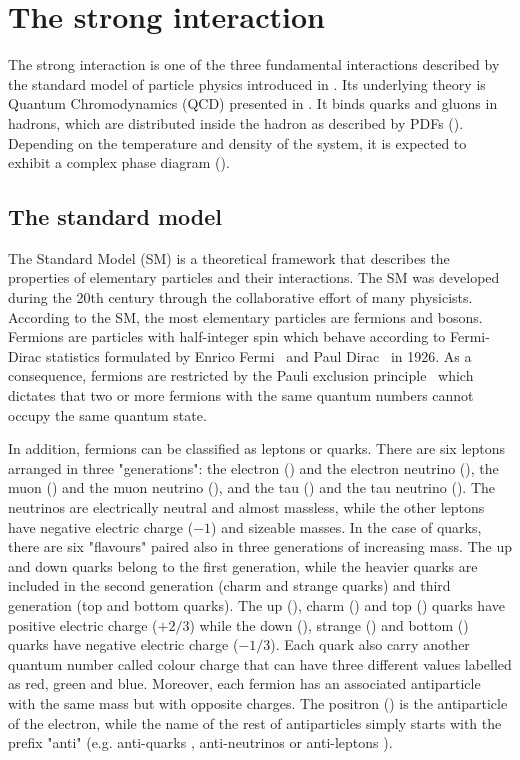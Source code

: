 \section{The strong interaction}\label{sec:Physics_SI}

The strong interaction is one of the three fundamental interactions described by the standard model of particle physics introduced in . Its underlying theory is Quantum Chromodynamics (QCD) presented in . It binds quarks and gluons in hadrons, which are distributed inside the hadron as described by PDFs (). Depending on the temperature and density of the system, it is expected to exhibit a complex phase diagram ().


\subsection{The standard model}\label{sec:Physics_SI_SM}

The Standard Model (SM) is a theoretical framework that describes the properties of elementary particles and their interactions. The SM was developed during the 20th century through the collaborative effort of many physicists. According to the SM, the most elementary particles are fermions and bosons. Fermions are particles with half-integer spin which behave according to Fermi-Dirac statistics formulated by Enrico Fermi~\cite{FermiDiracStatistics_1} and Paul Dirac~\cite{FermiDiracStatistics_2} in 1926. As a consequence, fermions are restricted by the Pauli exclusion principle~\cite{PauliExclusion} which dictates that two or more fermions with the same quantum numbers cannot occupy the same quantum state.

In addition, fermions can be classified as leptons or quarks. There are six leptons arranged in three "generations": the electron (\PGem) and the electron neutrino (\PGnGe), the muon (\PGmm) and the muon neutrino (\PGnGm), and the tau (\PGtm) and the tau neutrino (\PGnGt). The neutrinos are electrically neutral and almost massless, while the other leptons have negative electric charge ($-1$) and sizeable masses. In the case of quarks, there are six "flavours" paired also in three generations of increasing mass. The up and down quarks belong to the first generation, while the heavier quarks are included in the second generation (charm and strange quarks) and third generation (top and bottom quarks). The up (\cPqu), charm (\cPqc) and top (\cPqt) quarks have positive electric charge ($+2/3$) while the down (\cPqd), strange (\cPqs) and bottom (\cPqb) quarks have negative electric charge ($-1/3$). Each quark also carry another quantum number called colour charge that can have three different values labelled as red, green and blue. Moreover, each fermion has an associated antiparticle with the same mass but with opposite charges. The positron (\PGep) is the antiparticle of the electron, while the name of the rest of antiparticles simply starts with the prefix "anti" (e.g. anti-quarks \cPaq, anti-neutrinos \PAGn or anti-leptons \PGlp).

